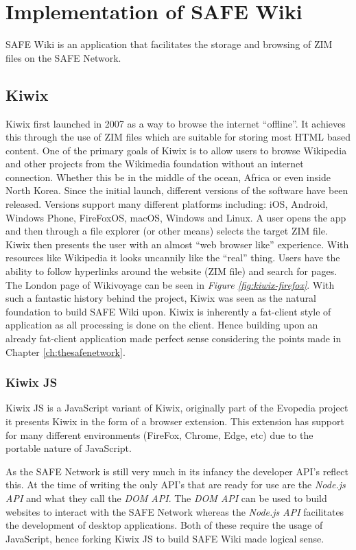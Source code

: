 \chapter{Implementation of SAFE Wiki}

SAFE Wiki is an application that facilitates the storage and browsing of ZIM files on the SAFE Network.

\section{Kiwix}

Kiwix first launched in 2007 as a way to browse the internet ``offline''. It achieves this through the use of ZIM files which are suitable for storing most HTML based content. One of the primary goals of Kiwix is to allow users to browse Wikipedia and other projects from the Wikimedia foundation without an internet connection. Whether this be in the middle of the ocean, Africa or even inside North Korea. Since the initial launch, different versions of the software have been released. Versions support many different platforms including: iOS, Android, Windows Phone, FireFoxOS, macOS, Windows and Linux. A user opens the app and then through a file explorer (or other means) selects the target ZIM file. Kiwix then presents the user with an almost ``web browser like'' experience. With resources like Wikipedia it looks uncannily like the ``real'' thing. Users have the ability to follow hyperlinks around the website (ZIM file) and search for pages. The London page of Wikivoyage can be seen in \textit{Figure \ref{fig:kiwix-firefox}}. With such a fantastic history behind the project, Kiwix was seen as the natural foundation to build SAFE Wiki upon. Kiwix is inherently a fat-client style of application as all processing is done on the client. Hence building upon an already fat-client application made perfect sense considering the points made in Chapter \ref{ch:thesafenetwork}.

\subsection{Kiwix JS}

Kiwix JS is a JavaScript variant of Kiwix, originally part of the Evopedia project it presents Kiwix in the form of a browser extension. This extension has support for many different environments (FireFox, Chrome, Edge, etc) due to the portable nature of JavaScript.

As the SAFE Network is still very much in its infancy the developer API's reflect this. At the time of writing the only API's that are ready for use are the \textit{Node.js API} and what they call the \textit{DOM API}. The \textit{DOM API} can be used to build websites to interact with the SAFE Network whereas the \textit{Node.js API} facilitates the development of desktop applications. Both of these require the usage of JavaScript, hence forking Kiwix JS to build SAFE Wiki made logical sense.

